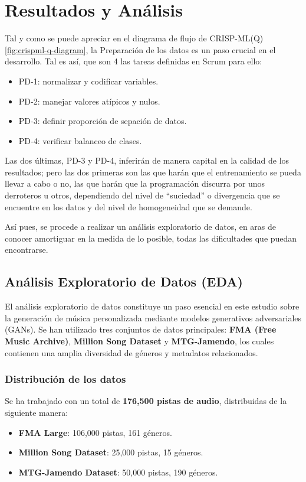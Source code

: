\chapter{Resultados y Análisis}

Tal y como se puede apreciar en el diagrama de flujo de CRISP-ML(Q)\ref{fig:crispml-q-diagram}, la Preparación de los datos es un paso crucial en el desarrollo. Tal es así, que son 4 las tareas definidas en Scrum para ello:
\begin{itemize}
    \item PD-1: normalizar y codificar variables.
    \item PD-2: manejar valores atípicos y nulos.
    \item PD-3: definir proporción de sepación de datos.
    \item PD-4: verificar balanceo de clases.
\end{itemize}

Las dos últimas, PD-3 y PD-4, inferirán de manera capital en la calidad de los resultados; pero las dos primeras son las que harán que el entrenamiento se pueda llevar a cabo o no, las que harán que la programación discurra por unos derroteros u otros, dependiendo del nivel de ``suciedad'' o divergencia que se encuentre en los datos y del nivel de homogeneidad que se demande.

Así pues, se procede a realizar un análisis exploratorio de datos, en aras de conocer amortiguar en la medida de lo posible, todas las dificultades que puedan encontrarse.

\section{Análisis Exploratorio de Datos (EDA)}

El análisis exploratorio de datos constituye un paso esencial en este estudio sobre la generación de música personalizada mediante modelos generativos adversariales (GANs). Se han utilizado tres conjuntos de datos principales: \textbf{FMA (Free Music Archive)}, \textbf{Million Song Dataset} y \textbf{MTG-Jamendo}, los cuales contienen una amplia diversidad de géneros y metadatos relacionados.

\subsection{Distribución de los datos}
Se ha trabajado con un total de \textbf{176,500 pistas de audio}, distribuidas de la siguiente manera:
\begin{itemize}
\item \textbf{FMA Large}: 106,000 pistas, 161 géneros.
\item \textbf{Million Song Dataset}: 25,000 pistas, 15 géneros.
\item \textbf{MTG-Jamendo Dataset}: 50,000 pistas, 190 géneros.
\end{itemize}

